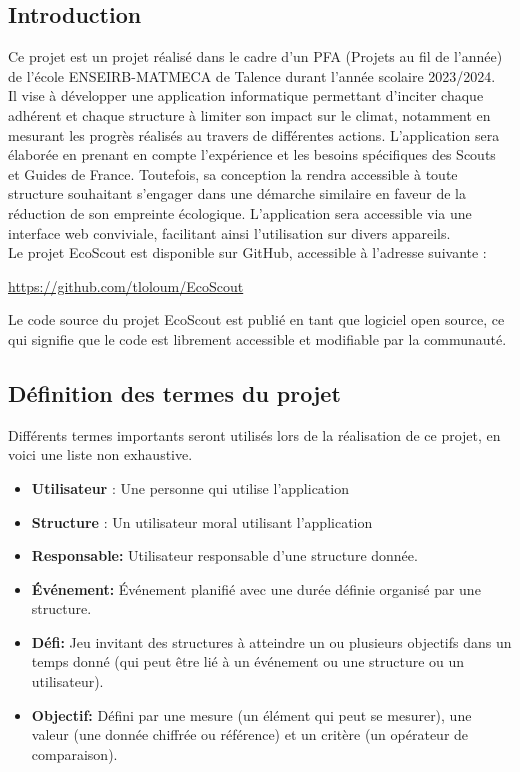 \subsection{Introduction}
Ce projet est un projet réalisé dans le cadre d'un PFA (Projets au fil de l'année)
de l'école ENSEIRB-MATMECA de Talence durant l'année scolaire 2023/2024. \\
\newline
Il vise à développer une application informatique permettant d’inciter chaque adhérent
et chaque structure à limiter son impact sur le climat, notamment en mesurant les 
progrès réalisés au travers de différentes actions. L'application sera élaborée en prenant en compte l'expérience et les besoins spécifiques des Scouts et Guides de France. Toutefois, sa conception la rendra accessible à toute structure souhaitant s'engager dans une démarche similaire en faveur de la réduction de son empreinte écologique. L'application sera accessible via une interface web conviviale, facilitant ainsi l'utilisation sur divers appareils. 
\\
\newline
Le projet EcoScout est disponible sur GitHub, accessible à l'adresse suivante :
\begin{center}
    \url{https://github.com/tloloum/EcoScout}
\end{center}
Le code source du projet EcoScout est publié en tant que logiciel open source, 
ce qui signifie que le code est librement accessible et modifiable par la communauté. 


\subsection{Définition des termes du projet}

Différents termes importants seront utilisés lors de la réalisation de ce projet, en voici une liste non exhaustive.
\begin{itemize}
    \item \textbf{Utilisateur} : Une personne qui utilise l'application
    \item \textbf{Structure} : Un utilisateur moral utilisant l'application
    \item \textbf{Responsable:} Utilisateur responsable d'une structure donnée.
    \item \textbf{Événement:} Événement planifié avec une durée définie organisé par une structure.
    \item \textbf{Défi:} Jeu invitant des structures à atteindre un ou plusieurs objectifs dans un temps donné (qui peut être lié à un événement ou une structure ou un utilisateur).
    \item \textbf{Objectif:} Défini par une mesure (un élément qui peut se mesurer), une valeur (une donnée chiffrée ou référence) 
    et un critère (un opérateur de comparaison). 
\end{itemize}


